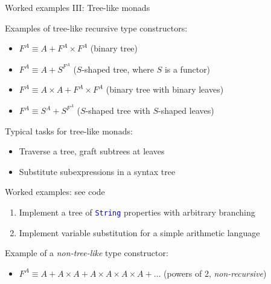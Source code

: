 \documentclass[english]{beamer}
\begin{document}
\begin{frame}{Worked examples III: Tree-like monads}

Examples of tree-like recursive type constructors:
\begin{itemize}
\item $F^{A}\equiv A+F^{A}\times F^{A}$ (binary tree)
\item $F^{A}\equiv A+S^{F^{A}}$ ($S$-shaped tree, where $S$ is a functor)
\item $F^{A}\equiv A\times A+F^{A}\times F^{A}$ (binary tree with binary
leaves)
\item $F^{A}\equiv S^{A}+S^{F^{A}}$ ($S$-shaped tree with $S$-shaped
leaves)
\end{itemize}
Typical tasks for tree-like monads:
\begin{itemize}
\item Traverse a tree, graft subtrees at leaves
\item Substitute subexpressions in a syntax tree
\end{itemize}
Worked examples: see code
\begin{enumerate}
\item Implement a tree of \texttt{\textcolor{blue}{\footnotesize{}String}}
properties with arbitrary branching
\item Implement variable substitution for a simple arithmetic language
\end{enumerate}
Example of a \emph{non-tree-like} type constructor:
\begin{itemize}
\item $F^{A}\equiv A+A\times A+A\times A\times A\times A+...$ (powers of
2, \emph{non-recursive})
\end{itemize}
\end{frame}
\end{document}
